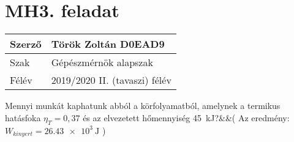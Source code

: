 

\section*{MH3. feladat}
\begin{tabular}{ | p{2cm} | p{14cm} | } 
	\hline
	Szerző & Török Zoltán D0EAD9 \\ 
	\hline
	Szak & Gépészmérnök alapszak\\ 
	\hline
	Félév & 2019/2020 II. (tavaszi) félév \\ 
	\hline
\end{tabular}
\vspace{0.5cm}

\noindent  Mennyi munkát kaphatunk abból a körfolyamatból, amelynek a termikus hatásfoka $\eta_T=0,37$ és az elvezetett hőmennyiség  \SI{45}{\kilo\joule}?&&( Az eredmény: $W_{kinyert}=\SI{26,43e3}{\joule}$ )
\\
\\
